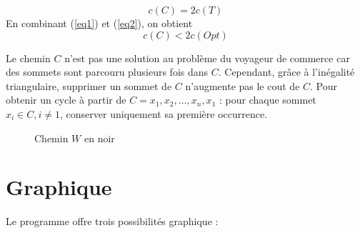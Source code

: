 \documentclass[a4paper,11pt]{article}
\begin{document}
\begin{equation}
c(C) = 2c(T)
\label{eq2}
\end{equation}
En combinant (\ref{eq1}) et (\ref{eq2}), on obtient
\begin{equation}
c(C) < 2c(Opt)
\label{eq3}
\end{equation}

Le chemin $C$ n'est pas une solution au problème du voyageur de commerce car des sommets sont parcouru plusieurs fois dans $C$. Cependant, grâce à l'inégalité triangulaire, supprimer un sommet de $C$ n’augmente pas le cout de $C$.
Pour obtenir un cycle à partir de $C = x_1, x_2, \ldots, x_n, x_1$ :
pour chaque sommet $x_i \in C, i\neq1$, conserver uniquement sa première occurrence.

\begin{figure}[!h]
\centering
{}
\caption{Chemin $W$ en noir}
\end{figure}

\section{Graphique} %
Le programme offre trois possibilités graphique :
\end{document}
